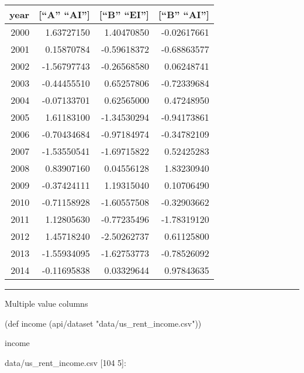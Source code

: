 \documentclass[]{article}
\newenvironment{Shaded}{\begin{snugshade}}{\end{snugshade}}
\newcommand{\StringTok}[1]{\textcolor[rgb]{0.31,0.60,0.02}{#1}}
\newcommand{\FunctionTok}[1]{\textcolor[rgb]{0.00,0.00,0.00}{#1}}
\newcommand{\BuiltInTok}[1]{#1}
\newcommand{\NormalTok}[1]{#1}
\begin{document}
\begin{longtable}[]{@{}rrrr@{}}
\toprule
year & {[}``A'' ``AI''{]} & {[}``B'' ``EI''{]} & {[}``B''
``AI''{]}\tabularnewline
\midrule
\endhead
2000 & 1.63727150 & 1.40470850 & -0.02617661\tabularnewline
2001 & 0.15870784 & -0.59618372 & -0.68863577\tabularnewline
2002 & -1.56797743 & -0.26568580 & 0.06248741\tabularnewline
2003 & -0.44455510 & 0.65257806 & -0.72339684\tabularnewline
2004 & -0.07133701 & 0.62565000 & 0.47248950\tabularnewline
2005 & 1.61183100 & -1.34530294 & -0.94173861\tabularnewline
2006 & -0.70434684 & -0.97184974 & -0.34782109\tabularnewline
2007 & -1.53550541 & -1.69715822 & 0.52425283\tabularnewline
2008 & 0.83907160 & 0.04556128 & 1.83230940\tabularnewline
2009 & -0.37424111 & 1.19315040 & 0.10706490\tabularnewline
2010 & -0.71158928 & -1.60557508 & -0.32903662\tabularnewline
2011 & 1.12805630 & -0.77235496 & -1.78319120\tabularnewline
2012 & 1.45718240 & -2.50262737 & 0.61125800\tabularnewline
2013 & -1.55934095 & -1.62753773 & -0.78526092\tabularnewline
2014 & -0.11695838 & 0.03329644 & 0.97843635\tabularnewline
\bottomrule
\end{longtable}

\begin{center}\rule{0.5\linewidth}{0.5pt}\end{center}

Multiple value columns

\begin{Shaded}
\begin{Highlighting}[]
\NormalTok{(}\BuiltInTok{def}\FunctionTok{ income }\NormalTok{(api/dataset }\StringTok{"data/us_rent_income.csv"}\NormalTok{))}
\end{Highlighting}
\end{Shaded}

\begin{Shaded}
\begin{Highlighting}[]
\NormalTok{income}
\end{Highlighting}
\end{Shaded}

data/us\_rent\_income.csv {[}104 5{]}:
\end{document}
